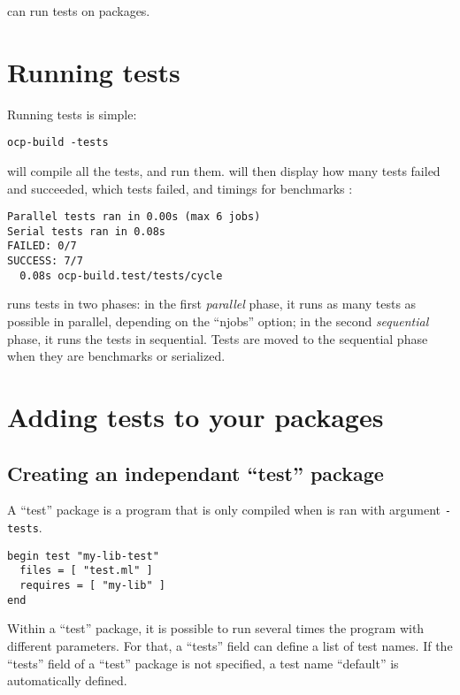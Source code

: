 
\ocpbuild{} can run tests on packages.

\section{Running tests}

Running tests is simple:
\begin{verbatim}
ocp-build -tests
\end{verbatim}

\ocpbuild{} will compile all the tests, and run them. \ocpbuild{} will
then display how many tests failed and succeeded, which tests failed,
and timings for benchmarks :

\begin{verbatim}
Parallel tests ran in 0.00s (max 6 jobs)
Serial tests ran in 0.08s
FAILED: 0/7
SUCCESS: 7/7
  0.08s	ocp-build.test/tests/cycle
\end{verbatim}

\ocpbuild{} runs tests in two phases: in the first \emph{parallel}
phase, it runs as many tests as possible in parallel, depending on the
``njobs'' option; in the second \emph{sequential} phase, it runs the
tests in sequential. Tests are moved to the sequential phase when they
are benchmarks or serialized.

\section{Adding tests to your packages}

\subsection{Creating an independant ``test'' package}

A ``test'' package is a program that is only compiled when 
\ocpbuild{} is ran with argument \verb+-tests+.

\begin{verbatim}
begin test "my-lib-test"
  files = [ "test.ml" ]
  requires = [ "my-lib" ]
end
\end{verbatim}

Within a ``test'' package, it is possible to run several times the
program with different parameters. For that, a ``tests'' field can
define a list of test names. If the ``tests'' field of a ``test''
package is not specified, a test name ``default'' is automatically
defined.


